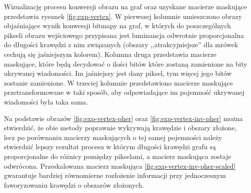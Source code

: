 {{{            Wizualizację procesu konwersji obrazu na graf oraz uzyskane macierze maskujące przedstawia rysunek
            \ref{fig:exp-vertex}. W pierwszej kolumnie umieszczono obrazy objaśniające wynik konwersji bitmapy na graf,
            w których do poszczególnych pikseli obrazu wejściowego przypisana jest luminancja odwrotnie proporcjonalna
            do długości krawędzi z nim związanych (obszary ,,atrakcyjniejsze'' dla mrówek cechują się jaśniejszym
            kolorem). Kolumna druga przedstawia macierze maskujące, które będą decydować o ilości bitów które zostaną
            zamienione na bity ukrywanej wiadomości. Im jaśniejszy jest dany piksel, tym więcej jego bitów zostanie
            zamienione. W trzeciej kolumnie przedstawiono macierze maskujące przetransformowane w taki sposób, aby
            odpowiadające im pojemność ukrywanej wiadomości była taka sama.

            Na podstawie obrazów \ref{fig:exp-vertex-pher} oraz \ref{fig:exp-vertex-inv-pher} można stwierdzić, że obie
            metody poprawnie wykrywają krawędzie i obszary złożone, lecz po porównaniu macierzy maskujących o tej samej
            pojemności należy stwierdzić lepszy rezultat procesu w którym długości krawędzi grafu są proporcjonalne do
            różnicy pomiędzy pikselami, a macierz maskująca zostaje odwrócona. Przeskalowana macierz maskująca
            \ref{fig:exp-vertex-inv-pher-scaled} gwarantuje bardziej równomierne rozłożenie informacji przy jednoczesnym
            faworyzowaniu krawędzi o obszarów złożonych.

            \begin{figure}
                \centering
\end{figure}}}}
